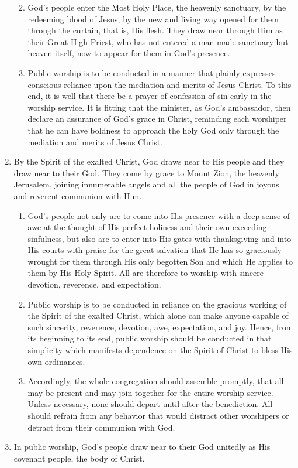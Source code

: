 \documentclass[
]{book}
\providecommand{\tightlist}{%
  \setlength{\itemsep}{0pt}\setlength{\parskip}{0pt}}
\begin{document}
\begin{enumerate}
  \begin{enumerate}
  \def\labelenumii{\alph{enumii}.}
  \tightlist
  \item
    God's people enter the Most Holy Place, the heavenly sanctuary, by the redeeming blood of Jesus, by the new and living way opened for them through the curtain, that is, His flesh. They draw near through Him as their Great High Priest, who has not entered a man-made sanctuary but heaven itself, now to appear for them in God's presence.
  \item
    Public worship is to be conducted in a manner that plainly expresses conscious reliance upon the mediation and merits of Jesus Christ. To this end, it is well that there be a prayer of confession of sin early in the worship service. It is fitting that the minister, as God's ambassador, then declare an assurance of God's grace in Christ, reminding each worshiper that he can have boldness to approach the holy God only through the mediation and merits of Jesus Christ.
  \end{enumerate}
\item
  By the Spirit of the exalted Christ, God draws near to His people and they draw near to their God. They come by grace to Mount Zion, the heavenly Jerusalem, joining innumerable angels and all the people of God in joyous and reverent communion with Him.

  \begin{enumerate}
  \def\labelenumii{\alph{enumii}.}
  \tightlist
  \item
    God's people not only are to come into His presence with a deep sense of awe at the thought of His perfect holiness and their own exceeding sinfulness, but also are to enter into His gates with thanksgiving and into His courts with praise for the great salvation that He has so graciously wrought for them through His only begotten Son and which He applies to them by His Holy Spirit. All are therefore to worship with sincere devotion, reverence, and expectation.
  \item
    Public worship is to be conducted in reliance on the gracious working of the Spirit of the exalted Christ, which alone can make anyone capable of such sincerity, reverence, devotion, awe, expectation, and joy. Hence, from its beginning to its end, public worship should be conducted in that simplicity which manifests dependence on the Spirit of Christ to bless His own ordinances.
  \item
    Accordingly, the whole congregation should assemble promptly, that all may be present and may join together for the entire worship service. Unless necessary, none should depart until after the benediction. All should refrain from any behavior that would distract other worshipers or detract from their communion with God.
  \end{enumerate}
\item
  In public worship, God's people draw near to their God unitedly as His covenant people, the body of Christ.


\end{enumerate}
\end{document}

